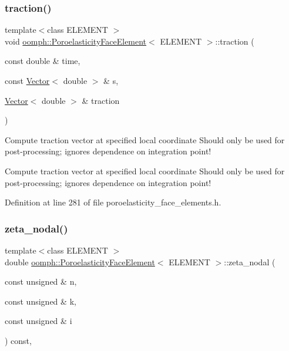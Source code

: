 \mbox{\label{classoomph_1_1PoroelasticityFaceElement_a1e82041ba48cda7bc31aa65165cf8208}} 
\subsubsection{\texorpdfstring{traction()}{traction()}}
{\footnotesize\ttfamily template$<$class E\+L\+E\+M\+E\+NT $>$ \\
void \hyperlink{classoomph_1_1PoroelasticityFaceElement}{oomph\+::\+Poroelasticity\+Face\+Element}$<$ E\+L\+E\+M\+E\+NT $>$\+::traction (\begin{DoxyParamCaption}\item[{const double \&}]{time,  }\item[{const \hyperlink{classoomph_1_1Vector}{Vector}$<$ double $>$ \&}]{s,  }\item[{\hyperlink{classoomph_1_1Vector}{Vector}$<$ double $>$ \&}]{traction }\end{DoxyParamCaption})}



Compute traction vector at specified local coordinate Should only be used for post-\/processing; ignores dependence on integration point! 

Compute traction vector at specified local coordinate Should only be used for post-\/processing; ignores dependence on integration point! 

Definition at line 281 of file poroelasticity\+\_\+face\+\_\+elements.\+h.

\mbox{\label{classoomph_1_1PoroelasticityFaceElement_af8381ad4d2c26cbc397d571ff56bc85f}} 
\subsubsection{\texorpdfstring{zeta\+\_\+nodal()}{zeta\_nodal()}}
{\footnotesize\ttfamily template$<$class E\+L\+E\+M\+E\+NT $>$ \\
double \hyperlink{classoomph_1_1PoroelasticityFaceElement}{oomph\+::\+Poroelasticity\+Face\+Element}$<$ E\+L\+E\+M\+E\+NT $>$\+::zeta\+\_\+nodal (\begin{DoxyParamCaption}\item[{const unsigned \&}]{n,  }\item[{const unsigned \&}]{k,  }\item[{const unsigned \&}]{i }\end{DoxyParamCaption}) const\hspace{0.3cm}{\ttfamily [inline]}, {\ttfamily [virtual]}}




